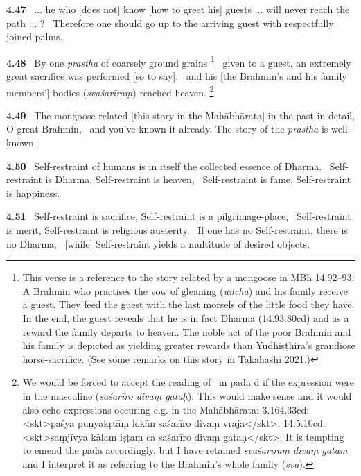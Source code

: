 \documentclass{article}
\newcommand{\skt}[1]{\textit{#1}}
\begin{document}
\textbf{4.47}%
\ ... he who [does not] know [how to greet his] guests ... will never reach the path ... ?%
\ Therefore one should go up to the arriving guest with respectfully joined palms.%


\textbf{4.48}%
\ By one \skt{prastha} of coarsely ground grains%
\footnote{This verse is a reference to the story related by a mongoose in MBh 14.92--93:                 A Brahmin who practises the vow of gleaning (\skt{uñcha}) and his family                receive a guest. They feed the guest with the last morsels of the little food                they have. In the end, the guest reveals that he is in fact Dharma (14.93.80cd) and as                 a reward the family departs to heaven. The noble act of the poor Brahmin and his family                is depicted as yielding greater rewards than Yudhiṣṭhira's grandiose horse-sacrifice.                 (See some remarks on this story in Takahashi 2021.) }%
\ given to a guest, an extremely great sacrifice was performed [so to say],%
\         and his [the Brahmin's and his family members'] bodies (\skt{svaśarīraṃ}) reached heaven.%
\footnote{

We would be forced to accept the reading of \Ed\ in pāda d if the expression                were in the masculine (\skt{saśarīro divaṃ gataḥ}). This would make sense                and it would also echo expressions occuring e.g. in the Mahābhārata:                3.164.33cd: <skt>paśya puṇyakṛtāṃ lokān saśarīro divaṃ vraja</skt>;                14.5.10cd:  <skt>saṃjīvya kālam iṣṭaṃ ca saśarīro divaṃ gataḥ</skt>.                It is tempting to emend the pāda accordingly, but I have retained                         \skt{svaśarīraṃ divaṃ gatam} and I interpret it as                         referring to the Brahmin's whole family (\skt{sva}).                 }%


\textbf{4.49}%
\ The mongoose related [this story in the Mahābhārata] in the past in detail, O great Brahmin,%
\ and you've known it already. The story of the \skt{prastha} is well-known.%


\textbf{4.50}%
\ Self-restraint of humans is in itself the collected essence of Dharma.%
\ Self-restraint is Dharma, Self-restraint is heaven,%
\                  Self-restraint is fame, Self-restraint is happiness.%


\textbf{4.51}%
\  Self-restraint is sacrifice, Self-restraint is a pilgrimage-place,%
\                   Self-restraint is merit, Self-restraint is religious austerity.%
\ If one has no Self-restraint, there is no Dharma,%
\                  [while] Self-restraint yields a multitude of desired objects.%
\end{document}
